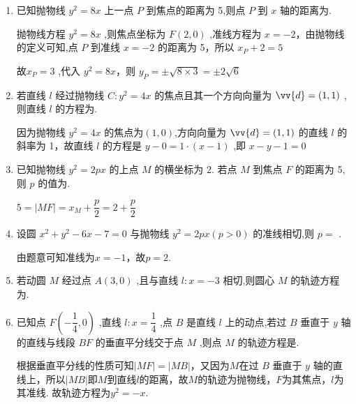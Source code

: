 \begin{enumerate}
    \item 已知抛物线 ${y}^{2} = {8x}$ 上一点 $P$ 到焦点的距离为 5,则点 $P$ 到 $x$ 轴的距离为.
    \begin{jieda}
        抛物线方程 ${y}^{2} = {8x}$ ,则焦点坐标为 $F\left( {2,0}\right)$ ,准线方程为 $x =  - 2$，由抛物线的定义可知,点 $P$ 到准线 $x =  - 2$ 的距离为 5，所以 ${x}_{P} + 2 = 5$ 
        
        故${x}_{P} = 3$ ,代入 ${y}^{2} = {8x}$，则 ${y}_{P} =  \pm  \sqrt{8 \times  3} =  \pm  2\sqrt{6}$
    \end{jieda}
    
    \item 若直线 $l$ 经过抛物线 $C : {y}^{2} = {4x}$ 的焦点且其一个方向向量为 $\vv{d} = \left( {1,1}\right)$ ,则直线 $l$ 的方程为.
    \begin{jieda}
        因为抛物线 ${y}^{2} = {4x}$ 的焦点为$(1,0)$,方向向量为 $\vv{d} = \left( {1,1}\right)$ 的直线 $l$ 的斜率为 1，故直线 $l$ 的方程是 $y - 0 = 1 \cdot  \left( {x - 1}\right)$ ,即 $x - y - 1 = 0$
    \end{jieda}
    
    \item 已知抛物线 ${y}^{2} = {2px}$ 的上点 $M$ 的横坐标为 2. 若点 $M$ 到焦点 $F$ 的距离为 5,则 $p$ 的值为.
    \begin{jieda}
        $5 = |MF| = x_M + \dfrac{p}{2} = 2 + \dfrac{p}{2}$
    \end{jieda}
    \item 设圆 ${x}^{2} + {y}^{2} - {6x} - 7 = 0$ 与抛物线 ${y}^{2} = {2px}\left( {p > 0}\right)$ 的准线相切,则 $p =$ .
    \begin{jieda}
        由题意可知准线为$x = -1$，故$p = 2$.
    \end{jieda}
    \item 若动圆 $M$ 经过点 $A\left( {3,0}\right)$ ,且与直线 $l : x =  - 3$ 相切,则圆心 $M$ 的轨迹方程为.
    
    \item 已知点 $F\left( {-\dfrac{1}{4},0}\right)$ ,直线 $l : x = \dfrac{1}{4}$ ,点 $B$ 是直线 $l$ 上的动点,若过 $B$ 垂直于 $y$ 轴的直线与线段 ${BF}$ 的垂直平分线交于点 $M$ ,则点 $M$ 的轨迹方程是.
    \begin{jieda}
        根据垂直平分线的性质可知$|MF| = |MB|$，又因为$M$在过 $B$ 垂直于 $y$ 轴的直线上，所以$|MB|$即$M$到直线$l$的距离，故$M$的轨迹为抛物线，$F$为其焦点，$l$为其准线. 故轨迹方程为$y^2 = -x$.
    \end{jieda}


\end{enumerate}
